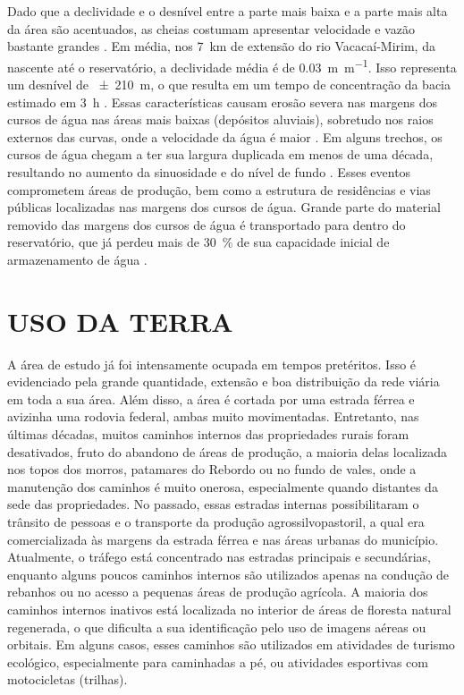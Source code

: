 Dado que a declividade e o desnível entre a parte mais baixa e a parte mais alta da área são acentuados, as 
cheias costumam apresentar velocidade e vazão bastante grandes \cite{PaivaEtAl2001, SutiliEtAl2009}. Em média, 
nos \SI{7}{\km} de extensão do rio Vacacaí-Mirim, da nascente até o reservatório, a declividade média é de 
\SI{0,03}{\m\per\m}. Isso representa um desnível de \SI{\pm210}{\m}, o que resulta em um tempo de concentração 
da bacia estimado em \SI{3}{\hour} \cite{PaivaEtAl2001}. Essas características causam erosão severa nas 
margens dos cursos de água nas áreas mais baixas (depósitos aluviais), sobretudo nos raios externos das 
curvas, onde a velocidade da água é maior \cite{SutiliEtAl2009}. Em alguns trechos, os cursos de água chegam a 
ter sua largura duplicada em menos de uma década, resultando no aumento da sinuosidade e do nível de fundo 
\cite{PaivaEtAl2001}. Esses eventos comprometem áreas de produção, bem como a estrutura de residências e vias 
públicas localizadas nas margens dos cursos de água. Grande parte do material removido das margens dos cursos 
de água é transportado para dentro do reservatório, que já perdeu mais de \SI{30}{\percent} de sua capacidade 
inicial de armazenamento de água \cite{DillEtAl2004}.

\section{USO DA TERRA}
\label{sec:chap03-landuse}

A área de estudo já foi intensamente ocupada em tempos pretéritos. Isso é evidenciado pela grande quantidade, 
extensão e boa distribuição da rede viária em toda a sua área. Além disso, a área é cortada por uma estrada 
férrea e avizinha uma rodovia federal, ambas muito movimentadas. Entretanto, nas últimas décadas, muitos 
caminhos internos das propriedades rurais foram desativados, fruto do abandono de áreas de produção, a maioria 
delas localizada nos topos dos morros, patamares do Rebordo ou no fundo de vales, onde a manutenção dos 
caminhos é muito onerosa, especialmente quando distantes da sede das propriedades. No passado, essas estradas 
internas 
possibilitaram o trânsito de pessoas e o transporte da produção agrossilvopastoril, a qual era comercializada 
às margens da estrada férrea e nas áreas urbanas do município. Atualmente, o tráfego está concentrado nas 
estradas principais e secundárias, enquanto alguns poucos caminhos internos são utilizados apenas na condução 
de rebanhos ou no acesso a pequenas áreas de produção agrícola. A maioria dos caminhos internos inativos está 
localizada no interior de áreas de floresta natural regenerada, o que dificulta a sua identificação pelo uso 
de imagens aéreas ou orbitais. Em alguns casos, esses caminhos são utilizados em atividades de turismo 
ecológico, especialmente para caminhadas a pé, ou atividades esportivas com motocicletas (trilhas).

